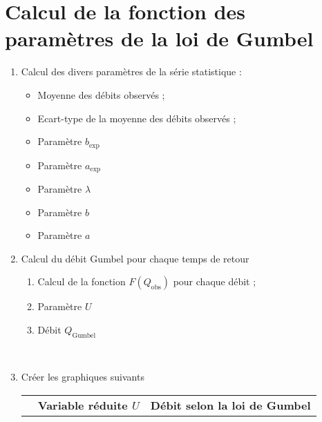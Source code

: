 \section{Calcul de la fonction des paramètres de la loi de Gumbel} \label{sec:loiGumbelTronquee}
\begin{enumerate}
    \item Calcul des divers paramètres de la série statistique :
    \begin{itemize}
        \item Moyenne des débits observés ; \\
        \item Ecart-type de la moyenne des débits observés ; \\
        \item Paramètre $b_\text{exp}$ 
        \item Paramètre $a_\text{exp}$ 
        \item Paramètre $\lambda$ 
        \item Paramètre $b$ 
        \item Paramètre $a$ 
    \end{itemize}
    \item Calcul du débit Gumbel pour chaque temps de retour
    \begin{enumerate}
        \item Calcul de la fonction $F(Q_\text{obs})$ pour chaque débit  ;
        \item Paramètre $U$ 
        \item Débit $Q_\text{Gumbel}$ 
    \end{enumerate}
     \\
    \bigskip
    \item Créer les graphiques suivants \\
    \begin{tabular}{p{3cm}|p{5cm}|p{5cm}}
        \hline
                                    & \textbf{Variable réduite $U$} & \textbf{Débit selon la loi de Gumbel} \\

\end{tabular}
\end{enumerate}

